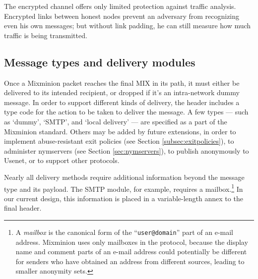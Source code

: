 \documentclass{llncs}
\begin{document}
The encrypted channel offers only limited protection against traffic
analysis. Encrypted links between honest nodes prevent an adversary
from recognizing even his own messages; but without link padding, he
can still measure how much traffic is being transmitted.

\subsection{Message types and delivery modules}
\label{subsec:delivery-modules}

Once a Mixminion packet reaches the final MIX in its path, it must
either be delivered to its intended recipient, or dropped if it's an
intra-network dummy message. In order to support different kinds of
delivery, the header includes a type code for the action to be taken
to deliver the message.  A few types --- such as `dummy', `SMTP', and `local
delivery' --- are specified as a part of the Mixminion standard.  Others
may be added by future extensions, in order to implement
abuse-resistant exit policies (see Section \ref{subsec:exitpolicies}),
to administer nymservers (see Section \ref{sec:nymservers}), to publish
anonymously to Usenet, or to support other protocols.

Nearly all delivery methods require additional information beyond the
message type and its payload.  The SMTP module, for example, requires
a mailbox.\footnote{A {\it mailbox} is the canonical form of the
``{\tt user@domain}'' part of an e-mail address. Mixminion uses only
mailboxes in the protocol, because the display name and comment parts
of an e-mail address could potentially be different for senders who
have obtained an address from different sources, leading to smaller
anonymity sets.}
In our current design, this information is placed
in a variable-length annex to the final header.
\end{document}
